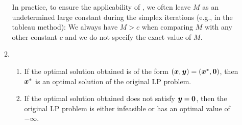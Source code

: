 \begin{enumerate}
\begin{enumerate}[label={(\arabic*)}]
\begin{note}
In practice, to ensure the applicability of , we
often leave \(M\) as an undetermined large constant during the simplex
iterations (e.g., in the tableau method): We always have \(M>c\) when comparing
\(M\) with any other constant \(c\) and we do not specify the exact value of
\(M\).
\end{note}
\item 
\begin{enumerate}
\item If the optimal solution obtained is of the form
\((\bm{x},\bm{y})=(\bm{x}^{*},\bm{0})\), then \(\bm{x}^*\) is an
optimal solution of the original LP problem.
\item If the optimal solution obtained does not satisfy \(\bm{y}=\bm{0}\),
then the original LP problem is either infeasible or has an optimal
value of \(-\infty\).
\end{enumerate}
\end{enumerate}
\end{enumerate}
